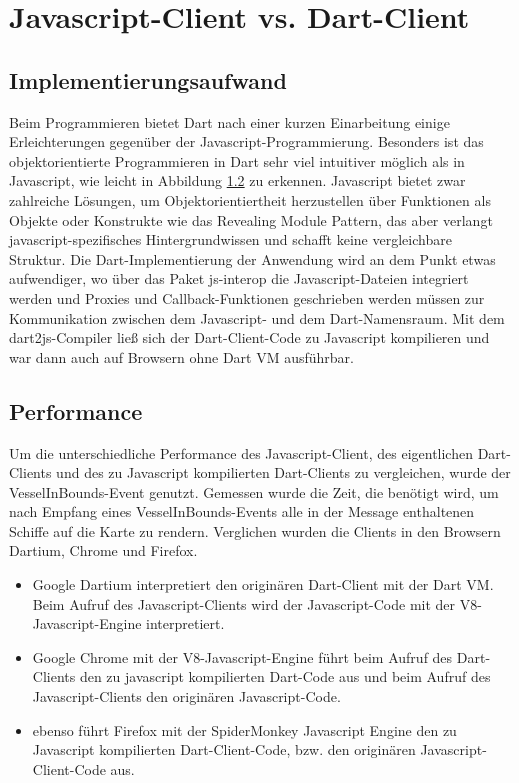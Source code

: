 \section{Javascript-Client vs. Dart-Client} 
\subsection{Implementierungsaufwand}
Beim Programmieren bietet Dart nach einer kurzen Einarbeitung einige Erleichterungen gegenüber der Javascript-Programmierung. Besonders ist das objektorientierte Programmieren in Dart sehr viel intuitiver möglich als in Javascript, wie leicht in Abbildung \ref{} zu erkennen. Javascript bietet zwar zahlreiche Lösungen, um Objektorientiertheit herzustellen über Funktionen als Objekte oder Konstrukte wie das Revealing Module Pattern, das aber verlangt javascript-spezifisches Hintergrundwissen und schafft keine vergleichbare Struktur.
Die Dart-Implementierung der Anwendung wird an dem Punkt etwas aufwendiger, wo über das Paket js-interop die Javascript-Dateien integriert werden und Proxies und Callback-Funktionen geschrieben werden müssen zur Kommunikation zwischen dem Javascript- und dem Dart-Namensraum.
Mit dem dart2js-Compiler ließ sich der Dart-Client-Code zu Javascript kompilieren und war dann auch auf Browsern ohne Dart VM ausführbar.
\subsection{Performance}
Um die unterschiedliche Performance des Javascript-Client, des eigentlichen Dart-Clients und des zu Javascript kompilierten Dart-Clients zu vergleichen, wurde der VesselInBounds-Event genutzt. Gemessen wurde die Zeit, die benötigt wird, um nach Empfang eines VesselInBounds-Events alle in der Message enthaltenen Schiffe auf die Karte zu rendern. Verglichen wurden die Clients in den Browsern Dartium, Chrome und Firefox.
\begin{itemize}
\item Google Dartium interpretiert den originären Dart-Client mit der Dart VM. Beim Aufruf des Javascript-Clients wird der Javascript-Code mit der V8-Javascript-Engine interpretiert.
\item Google Chrome  mit der V8-Javascript-Engine führt beim Aufruf des Dart-Clients den zu javascript kompilierten Dart-Code aus und beim Aufruf des Javascript-Clients den originären Javascript-Code.
\item ebenso führt Firefox mit der SpiderMonkey Javascript Engine den zu Javascript kompilierten Dart-Client-Code, bzw. den originären Javascript-Client-Code aus.
\end {itemize}


